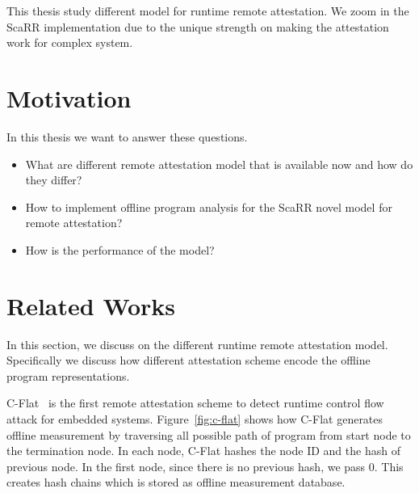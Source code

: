 This thesis study different model for runtime remote attestation. We zoom in the
ScaRR implementation due to the unique strength on making the attestation work
for complex system.

\section{Motivation}

In this thesis we want to answer these questions.
\begin{itemize}
    \item What are different remote attestation model that is available now and
    how do they differ?
    \item How to implement offline program analysis for the ScaRR novel model
    for remote attestation?
    \item How is the performance of the model?
\end{itemize}

\section{Related Works}

In this section, we discuss on the different runtime remote attestation
model. Specifically we discuss how different attestation scheme encode the
offline program representations.

C-Flat~\cite{aberaCFLATControlFlowAttestation2016} is the first remote
attestation scheme to detect runtime control flow attack for embedded systems.
Figure~\ref{fig:c-flat} shows how C-Flat generates offline measurement by
traversing all possible path of program from start node to the termination node.
In each node, C-Flat hashes the node ID and the hash of previous node. In the
first node, since there is no previous hash, we pass 0. This creates hash chains
which is stored as offline measurement database.

